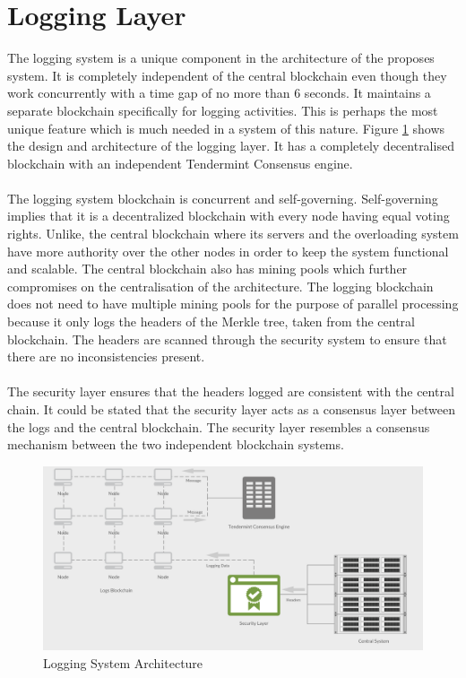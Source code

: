 \documentclass[a4paper,twoside,phd]{BYUPhys}
\begin{document}
\section{Logging Layer}
The logging system is a unique component in the architecture of the proposes system. It is completely independent of the central blockchain even though they work concurrently with a time gap of no more than 6 seconds. It maintains a separate blockchain specifically for logging activities. This is perhaps the most unique feature which is much needed in a system of this nature. Figure \ref{logginglayer} shows the design and architecture of the logging layer. It has a completely decentralised blockchain with an independent Tendermint Consensus engine.
\\
\\
The logging system blockchain is concurrent and self-governing. Self-governing implies that it is a decentralized blockchain with every node having equal voting rights. Unlike, the central blockchain where its servers and the overloading system have more authority over the other nodes in order to keep the system functional and scalable. The central blockchain also has mining pools which further compromises on the centralisation of the architecture. The logging blockchain does not need to have multiple mining pools for the purpose of parallel processing because it only logs the headers of the Merkle tree, taken from the central blockchain. The headers are scanned through the security system to ensure that there are no inconsistencies present.\\
\\
The security layer ensures that the headers logged are consistent with the central chain. It could be stated that the security layer acts as a consensus layer between the logs and the central blockchain. The security layer resembles a consensus mechanism between the two independent blockchain systems.
\begin{figure}
  \includegraphics[width=\linewidth]{logging_layer.png}
  \caption{Logging System Architecture}
  \label{logginglayer}
\end{figure}
\end{document}
